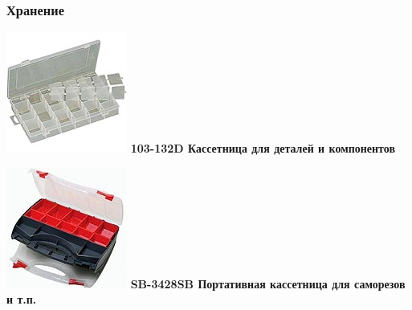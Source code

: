\documentclass{magazine}
\begin{document}
\begin{multicols}{2}
\subsubsection{Хранение}

\noindent\includegraphics[width=\columnwidth]{fig/00/pros/103-132D.jpg}
\textbf{103-132D Кассетница для деталей и компонентов}

\noindent\includegraphics[width=\columnwidth]{fig/00/pros/SB-3428SB.jpg}
\textbf{SB-3428SB Портативная кассетница для саморезов и т.п.}


\end{multicols}
\end{document}
